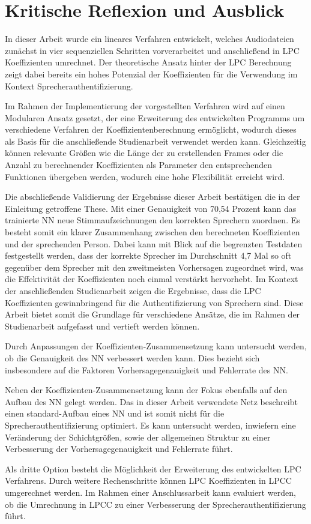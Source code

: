 \section{Kritische Reflexion und Ausblick}\label{sec:Ausblick}
In dieser Arbeit wurde ein lineares Verfahren entwickelt, welches Audiodateien zunächst in vier sequenziellen Schritten vorverarbeitet und anschließend in \ac{LPC} Koeffizienten umrechnet.
Der theoretische Ansatz hinter der \ac{LPC} Berechnung zeigt dabei bereits ein hohes Potenzial der Koeffizienten für die Verwendung im Kontext Sprecherauthentifizierung.

Im Rahmen der Implementierung der vorgestellten Verfahren wird auf einen Modularen Ansatz gesetzt, der eine Erweiterung des entwickelten Programms um verschiedene Verfahren der Koeffizientenberechnung ermöglicht, wodurch dieses als Basis für die anschließende Studienarbeit verwendet werden kann.
Gleichzeitig können relevante Größen wie die Länge der zu erstellenden Frames oder die Anzahl zu berechnender Koeffizienten als Parameter den entsprechenden Funktionen übergeben werden, wodurch eine hohe Flexibilität erreicht wird.

Die abschließende Validierung der Ergebnisse dieser Arbeit bestätigen die in der Einleitung getroffene These.
Mit einer Genauigkeit von 70,54 Prozent kann das trainierte \ac{NN} neue Stimmaufzeichnungen den korrekten Sprechern zuordnen.
Es besteht somit ein klarer Zusammenhang zwischen den berechneten Koeffizienten und der sprechenden Person.
Dabei kann mit Blick auf die begrenzten Testdaten festgestellt werden, dass der korrekte Sprecher im Durchschnitt 4,7 Mal so oft gegenüber dem Sprecher mit den zweitmeisten Vorhersagen zugeordnet wird, was die Effektivität der Koeffizienten noch einmal verstärkt hervorhebt.
\newline
\newline
Im Kontext der anschließenden Studienarbeit zeigen die Ergebnisse, dass die \ac{LPC} Koeffizienten gewinnbringend für die Authentifizierung von Sprechern sind.
Diese Arbeit bietet somit die Grundlage für verschiedene Ansätze, die im Rahmen der Studienarbeit aufgefasst und vertieft werden können.

Durch Anpassungen der Koeffizienten-Zusammensetzung kann untersucht werden, ob die Genauigkeit des \ac{NN} verbessert werden kann.
Dies bezieht sich insbesondere auf die Faktoren Vorhersagegenauigkeit und Fehlerrate des \ac{NN}.

Neben der Koeffizienten-Zusammensetzung kann der Fokus ebenfalls auf den Aufbau des \ac{NN} gelegt werden.
Das in dieser Arbeit verwendete Netz beschreibt einen standard-Aufbau eines \ac{NN} und ist somit nicht für die Sprecherauthentifizierung optimiert.
Es kann untersucht werden, inwiefern eine Veränderung der Schichtgrößen, sowie der allgemeinen Struktur zu einer Verbesserung der Vorhersagegenauigkeit und Fehlerrate führt.

Als dritte Option besteht die Möglichkeit der Erweiterung des entwickelten \ac{LPC} Verfahrens.
Durch weitere Rechenschritte können \ac{LPC} Koeffizienten in \ac{LPCC} umgerechnet werden.
Im Rahmen einer Anschlussarbeit kann evaluiert werden, ob die Umrechnung in \ac{LPCC} zu einer Verbesserung der Sprecherauthentifizierung führt.
